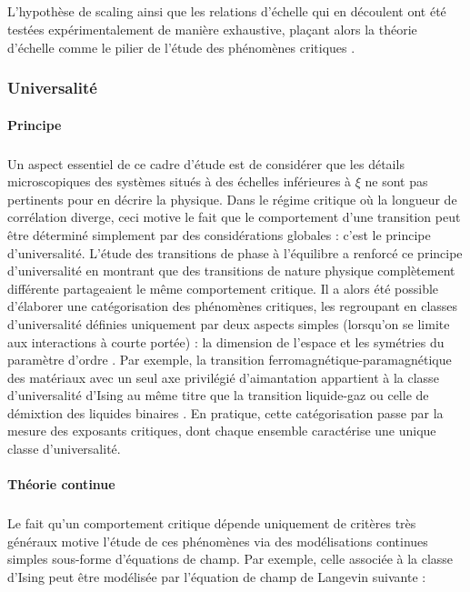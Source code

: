 \subparagraph{}L'hypothèse de scaling ainsi que les relations d'échelle qui en découlent ont été testées expérimentalement de manière exhaustive, plaçant alors la théorie d'échelle comme le pilier de l'étude des phénomènes critiques \cite{lubeck_universal_2004}.

\subsubsection{Universalité}

\label{sec:univcritique}

\paragraph{Principe}

\subparagraph{}Un aspect essentiel de ce cadre d'étude est de considérer que les détails microscopiques des systèmes situés à des échelles inférieures à $\xi$ ne sont pas pertinents pour en décrire la physique. Dans le régime critique où la longueur de corrélation diverge, ceci motive le fait que le comportement d'une transition peut être déterminé simplement par des considérations globales : c'est le principe d'universalité. L'étude des transitions de phase à l'équilibre a renforcé ce principe d'universalité en montrant que des transitions de nature physique complètement différente partageaient le même comportement critique. Il a alors été possible d'élaborer une catégorisation des phénomènes critiques, les regroupant en classes d'universalité définies uniquement par deux aspects simples (lorsqu'on se limite aux interactions à courte portée) : la dimension de l'espace et les symétries du paramètre d'ordre \cite{kardar_statistical_2007}. Par exemple, la transition ferromagnétique-paramagnétique des matériaux avec un seul axe privilégié d'aimantation appartient à la classe d'universalité d'Ising au même titre que la transition liquide-gaz ou celle de démixtion des liquides binaires \cite{lubeck_universal_2004}. En pratique, cette catégorisation passe par la mesure des exposants critiques, dont chaque ensemble caractérise une unique classe d'universalité.

\paragraph{Théorie continue}

\subparagraph{}Le fait qu'un comportement critique dépende uniquement de critères très généraux motive l'étude de ces phénomènes via des modélisations continues simples sous-forme d'équations de champ.  Par exemple, celle associée à la classe d'Ising peut être modélisée par l'équation de champ de Langevin suivante :

